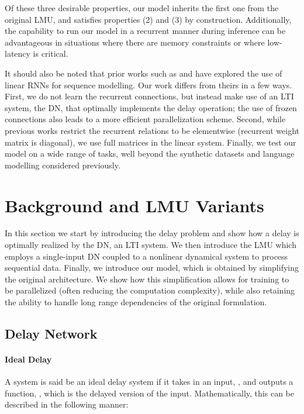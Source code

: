 \documentclass{article}
\begin{document}
Of these three desirable properties, our model inherits the first one from the original LMU, and satisfies properties (2) and (3) by construction. Additionally, the capability to run our model in a recurrent manner during inference can be advantageous in situations where there are memory constraints or where low-latency is critical. 

It should also be noted that prior works such as \citet{balduzzi2016strongly} and \citet{martin2017parallelizing}  have explored the use of linear RNNs for sequence modelling. Our work differs from theirs in a few ways. First, we do not learn the recurrent connections, but instead make use of an LTI system, the DN, that optimally implements the delay operation; the use of frozen connections also leads to a more efficient parallelization scheme.  Second, while previous works restrict the recurrent relations to be elementwise (recurrent weight matrix is diagonal), we use full matrices in the linear system. Finally, we test our model on a wide range of tasks, well beyond the synthetic datasets \citep{martin2017parallelizing} and language modelling \citep{balduzzi2016strongly} considered previously.

\section{Background and LMU Variants}

In this section we start by introducing the delay problem and show how a delay is optimally realized by the DN, an LTI system. We then introduce the LMU which employs a single-input DN coupled to a nonlinear dynamical system to process sequential data. Finally, we introduce our model, which is obtained by simplifying the original architecture. We show how this simplification allows for training to be parallelized (often reducing the computation complexity), while also retaining the ability to handle long range dependencies of the original formulation. 



\subsection{Delay Network}
\paragraph{Ideal Delay} A system is said be an ideal delay system if it takes in an input, , and outputs a function, , which is the delayed version of the input. Mathematically, this can be described in the following manner:
\end{document}
